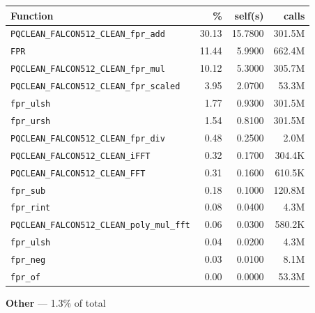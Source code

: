 \documentclass[11pt,a4paper]{article}
\begin{document}
\begin{longtable}{p{7.5cm}rrr}
\toprule
Function & \% & self(s) & calls \\
\midrule
\endhead
  \texttt{PQCLEAN\_FALCON512\_CLEAN\_fpr\_add} & 30.13 & 15.7800 & 301.5M \\
  \texttt{FPR} & 11.44 & 5.9900 & 662.4M \\
  \texttt{PQCLEAN\_FALCON512\_CLEAN\_fpr\_mul} & 10.12 & 5.3000 & 305.7M \\
  \texttt{PQCLEAN\_FALCON512\_CLEAN\_fpr\_scaled} & 3.95 & 2.0700 & 53.3M \\
  \texttt{fpr\_ulsh} & 1.77 & 0.9300 & 301.5M \\
  \texttt{fpr\_ursh} & 1.54 & 0.8100 & 301.5M \\
  \texttt{PQCLEAN\_FALCON512\_CLEAN\_fpr\_div} & 0.48 & 0.2500 & 2.0M \\
  \texttt{PQCLEAN\_FALCON512\_CLEAN\_iFFT} & 0.32 & 0.1700 & 304.4K \\
  \texttt{PQCLEAN\_FALCON512\_CLEAN\_FFT} & 0.31 & 0.1600 & 610.5K \\
  \texttt{fpr\_sub} & 0.18 & 0.1000 & 120.8M \\
  \texttt{fpr\_rint} & 0.08 & 0.0400 & 4.3M \\
  \texttt{PQCLEAN\_FALCON512\_CLEAN\_poly\_mul\_fft} & 0.06 & 0.0300 & 580.2K \\
  \texttt{fpr\_ulsh} & 0.04 & 0.0200 & 4.3M \\
  \texttt{fpr\_neg} & 0.03 & 0.0100 & 8.1M \\
  \texttt{fpr\_of} & 0.00 & 0.0000 & 53.3M \\
\bottomrule
\end{longtable}

\noindent\colorbox{othercolor}{\strut \textbf{Other} --- 1.3\% of total}
\vspace{2pt}
\end{document}
